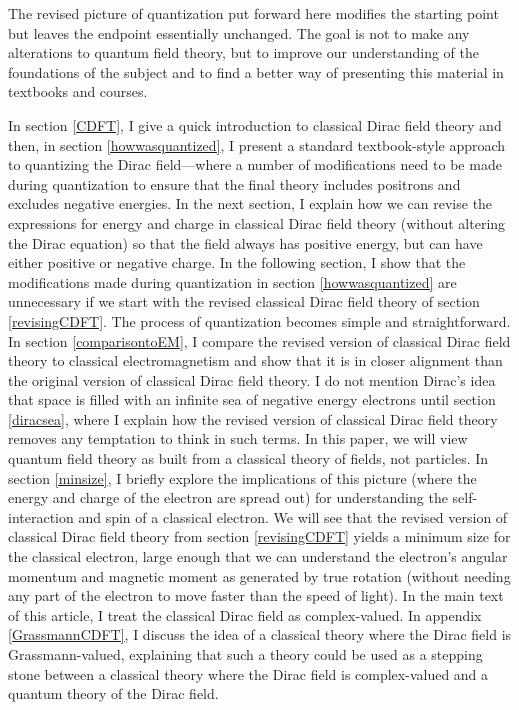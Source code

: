 \documentclass[onecolumn,secnumarabic,amsmath,amssymb,balancelastpage,nofootinbib]{article}
\begin{document}
The revised picture of quantization put forward here modifies the starting point but leaves the endpoint essentially unchanged.  The goal is not to make any alterations to quantum field theory, but to improve our understanding of the foundations of the subject and to find a better way of presenting this material in textbooks and courses.

In section \ref{CDFT}, I give a quick introduction to classical Dirac field theory and then, in section \ref{howwasquantized}, I present a standard textbook-style approach to quantizing the Dirac field---where a number of modifications need to be made during quantization to ensure that the final theory includes positrons and excludes negative energies.  In the next section, I explain how we can revise the expressions for energy and charge in classical Dirac field theory (without altering the Dirac equation) so that the field always has positive energy, but can have either positive or negative charge.  In the following section, I show that the modifications made during quantization in section \ref{howwasquantized} are unnecessary if we start with the revised classical Dirac field theory of section \ref{revisingCDFT}.  The process of quantization becomes simple and straightforward.  In section \ref{comparisontoEM}, I compare the revised version of classical Dirac field theory to classical electromagnetism and show that it is in closer alignment than the original version of classical Dirac field theory.  I do not mention Dirac's idea that space is filled with an infinite sea of negative energy electrons until section \ref{diracsea}, where I explain how the revised version of classical Dirac field theory removes any temptation to think in such terms.  In this paper, we will view quantum field theory as built from a classical theory of fields, not particles.  In section \ref{minsize}, I briefly explore the implications of this picture (where the energy and charge of the electron are spread out) for understanding the self-interaction and spin of a classical electron.  We will see that the revised version of classical Dirac field theory from section \ref{revisingCDFT} yields a minimum size for the classical electron, large enough that we can understand the electron's angular momentum and magnetic moment as generated by true rotation (without needing any part of the electron to move faster than the speed of light).  In the main text of this article, I treat the classical Dirac field as complex-valued.  In appendix \ref{GrassmannCDFT}, I discuss the idea of a classical theory where the Dirac field is Grassmann-valued, explaining that such a theory could be used as a stepping stone between a classical theory where the Dirac field is complex-valued and a quantum theory of the Dirac field.
\end{document}
